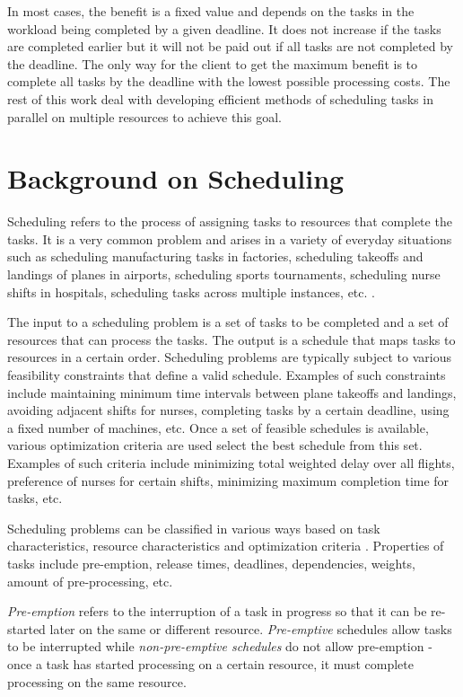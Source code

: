 \documentclass[12pt]{report}
\begin{document}
In most cases, the benefit is a fixed value and depends on the tasks in the workload being completed by a given deadline.
It does not increase if the tasks are completed earlier but it will not be paid out if all tasks are not completed by the deadline.
The only way for the client to get the maximum benefit is to complete all tasks by the deadline with the lowest possible processing costs.
The rest of this work deal with developing efficient methods of scheduling tasks in parallel on multiple resources to achieve this goal.


\section{Background on Scheduling}

\label{SchedulingOverview}
Scheduling refers to the process of assigning tasks to resources that complete the tasks.
It is a very common problem and arises in a variety of everyday situations such as scheduling manufacturing tasks in factories, scheduling takeoffs and landings of planes in airports, scheduling sports tournaments, scheduling nurse shifts in hospitals, scheduling tasks across multiple instances, etc. \cite{Hoos2004}.

The input to a scheduling problem is a set of tasks to be completed and a set of resources that can process the tasks.
The output is a schedule that maps tasks to resources in a certain order.
Scheduling problems are typically subject to various feasibility constraints that define a valid schedule.
Examples of such constraints include maintaining minimum time intervals between plane takeoffs and landings, avoiding adjacent shifts for nurses, completing tasks by a certain deadline, using a fixed number of machines, etc.
Once a set of feasible schedules is available, various optimization criteria are used select the best schedule from this set.
Examples of such criteria include minimizing total weighted delay over all flights, preference of nurses for certain shifts, minimizing maximum completion time for tasks, etc.

Scheduling problems can be classified in various ways based on task characteristics, resource characteristics and optimization criteria \cite{Hoos2004, Pinedo2012}. Properties of tasks include pre-emption, release times, deadlines, dependencies, weights, amount of pre-processing, etc.

\textit{Pre-emption} refers to the interruption of a task in progress so that it can be re-started later on the same or different resource.
\textit{Pre-emptive} schedules allow tasks to be interrupted while \textit{non-pre-emptive schedules} do not allow pre-emption - once a task has started processing on a certain resource, it must complete processing on the same resource.
\end{document}

